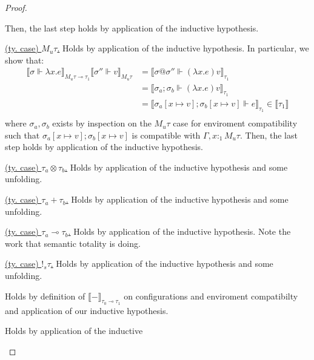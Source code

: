 \begin{proof}
\begin{description}
\begin{description}
        Then, the last step holds by application of the inductive hypothesis.
      \item{\underline{(ty. case) $M_u \tau$.}} 
        Holds by application of the inductive hypothesis. 
        In particular, we show that:
        \begin{equation*}
          \begin{aligned}
            \llbracket \sigma \Vdash \lambda x . e \rrbracket_{M_u \tau \multimap \tau_1} \llbracket \sigma'' \Vdash v
            \rrbracket_{M_u \tau} &=
            \llbracket \sigma @ \sigma'' \Vdash (\lambda x . e) v
            \rrbracket_{\tau_1} \\
            &=
            \llbracket \sigma_a; \sigma_b \Vdash (\lambda x . e) v
            \rrbracket_{\tau_1} \\
            & =
            \llbracket \sigma_a[x \mapsto v]; \sigma_b[x \mapsto v] \Vdash e
            \rrbracket_{\tau_1} \in \llbracket \tau_1 \rrbracket \\
          \end{aligned}
        \end{equation*}
        where $\sigma_a, \sigma_b$ exists by inspection on the $M_u \tau$ case
        for enviroment compatibility such that $\sigma_a[x \mapsto v];
        \sigma_b[x \mapsto v]$ is compatible with $\Gamma, x :_1 M_u \tau$.
        Then, the last step holds by application of the inductive hypothesis.
      \item{\underline{(ty. case) $\tau_a \otimes \tau_b$.}} Holds by
        application of the inductive hypothesis and some unfolding.
      \item{\underline{(ty. case) $\tau_a + \tau_b$.}} Holds by application of
        the inductive hypothesis and some unfolding.
      \item{\underline{(ty. case) $\tau_a \multimap \tau_b$.}} Holds by
        application of the inductive hypothesis. Note the work that semantic
        totality is doing.
      \item{\underline{(ty. case) $!_s \tau$.}} Holds by application of the
        inductive hypothesis and some unfolding.
    \end{description}
  \item[\textsc{(ty. rule) $\multimap E$.}] Holds by definition of $\llbracket -
    \rrbracket_{\tau_0 \multimap \tau_1}$ on configurations and enviroment
    compatibilty and application of our inductive hypothesis.
  \item[\textsc{(ty. rule) $! I$.}] Holds by application of the inductive

\end{description}
\end{proof}
